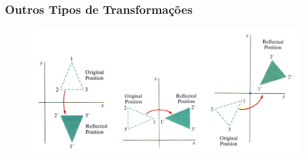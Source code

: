 \documentclass{beamer}
\begin{document}
\begin{frame}
\frametitle{Outros Tipos de Transformações}

	\begin{figure}[!h]
		\begin{center}
			\includegraphics[width=0.9\textwidth]{Figures/reflexo}
		\end{center}
	\end{figure}
		
\end{frame}	

\end{document}
